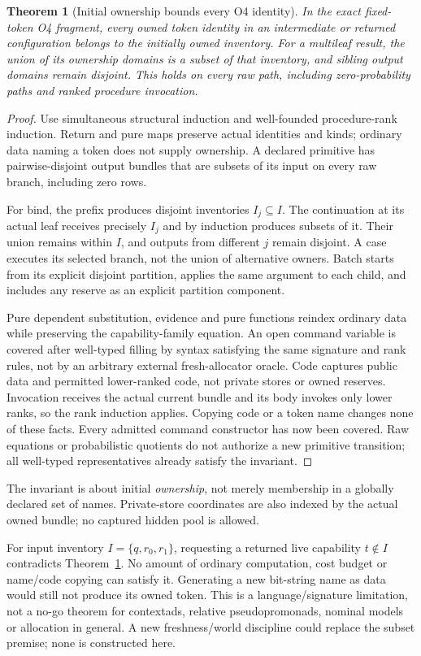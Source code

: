 \documentclass[11pt,a4paper]{article}
\newtheorem{theorem}{Theorem}[section]
\theoremstyle{definition}
\begin{document}
\begin{theorem}[Initial ownership bounds every O4 identity]\label{thm:F}
In the exact fixed-token O4 fragment, every owned token identity in an
intermediate or returned configuration belongs to the initially owned
inventory. For a multileaf result, the union of its ownership domains is
a subset of that inventory, and sibling output domains remain disjoint.
This holds on every raw path, including zero-probability paths and ranked
procedure invocation.
\end{theorem}
\begin{proof}
Use simultaneous structural induction and well-founded procedure-rank
induction. Return and pure maps preserve actual identities and kinds;
ordinary data naming a token does not supply ownership. A declared
primitive has pairwise-disjoint output bundles that are subsets of its
input on every raw branch, including zero rows.

For bind, the prefix produces disjoint inventories $I_j\subseteq I$.
The continuation at its actual leaf receives precisely $I_j$ and by
induction produces subsets of it. Their union remains within $I$, and
outputs from different $j$ remain disjoint. A case executes its selected
branch, not the union of alternative owners. Batch starts from its
explicit disjoint partition, applies the same argument to each child,
and includes any reserve as an explicit partition component.

Pure dependent substitution, evidence and pure functions reindex ordinary
data while preserving the capability-family equation. An open command
variable is covered after well-typed filling by syntax satisfying the
same signature and rank rules, not by an arbitrary external fresh-allocator
oracle. Code captures public data and permitted lower-ranked code, not
private stores or owned reserves. Invocation receives the actual current
bundle and its body invokes only lower ranks, so the rank induction
applies. Copying code or a token name changes none of these facts.
Every admitted command constructor has now been covered. Raw equations
or probabilistic quotients do not authorize a new primitive transition;
all well-typed representatives already satisfy the invariant.
\end{proof}
The invariant is about initial \emph{ownership}, not merely membership
in a globally declared set of names. Private-store coordinates are also
indexed by the actual owned bundle; no captured hidden pool is allowed.

For input inventory $I=\{q,r_0,r_1\}$, requesting a returned live
capability $t\notin I$ contradicts Theorem~\ref{thm:F}.
No amount of ordinary computation, cost budget or name/code copying can
satisfy it. Generating a new bit-string name as data would still not
produce its owned token. This is a language/signature limitation, not a
no-go theorem for contextads, relative pseudopromonads, nominal models or
allocation in general. A new freshness/world discipline could replace
the subset premise; none is constructed here.
\end{document}
